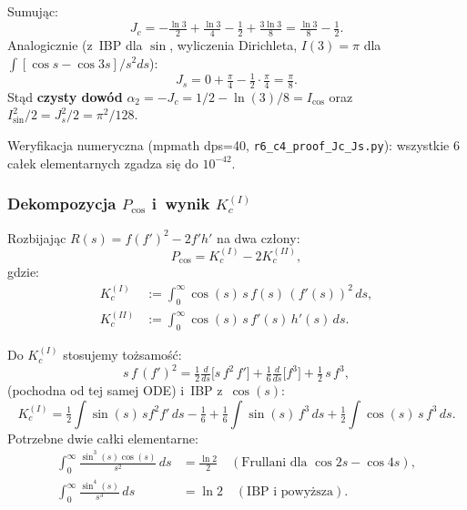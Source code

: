 Sumuj\k{a}c:
\begin{equation}
  \boxed{\;J_c = -\tfrac{\ln 3}{2} + \tfrac{\ln 3}{4} - \tfrac{1}{2} + \tfrac{3\ln 3}{8}
          = \tfrac{\ln 3}{8} - \tfrac{1}{2}.\;}
\end{equation}
Analogicznie (z~IBP dla $\sin$, wyliczenia Dirichleta, $I(3) = \pi$ dla $\int [\cos s - \cos 3s]/s^2 ds$):
\begin{equation}
  \boxed{\;J_s = 0 + \tfrac{\pi}{4} - \tfrac{1}{2}\cdot\tfrac{\pi}{4} = \tfrac{\pi}{8}.\;}
\end{equation}
St\k{a}d \textbf{czysty dow\'od} $\alpha_2 = -J_c = 1/2 - \ln(3)/8 = I_{\cos}$ oraz
$I_{\sin}^2/2 = J_s^2/2 = \pi^2/128$.

Weryfikacja numeryczna (mpmath dps=40, \texttt{r6\_c4\_proof\_Jc\_Js.py}):
wszystkie 6 ca\l{}ek elementarnych zgadza si\k{e} do $10^{-42}$.

\subsubsection*{Dekompozycja $P_{\cos}$ i~wynik $K_c^{(I)}$}

Rozbijaj\k{a}c $R(s) = f(f')^2 - 2 f' h'$ na dwa cz\l{}ony:
\begin{equation}
  P_{\cos} = K_c^{(I)} - 2 K_c^{(II)},
\end{equation}
gdzie:
\begin{align}
  K_c^{(I)} &:= \int_0^\infty \cos(s)\,s\,f(s)\,(f'(s))^2\,ds, \\
  K_c^{(II)} &:= \int_0^\infty \cos(s)\,s\,f'(s)\,h'(s)\,ds.
\end{align}

Do $K_c^{(I)}$ stosujemy to\.zsamo\'s\'c:
\begin{equation}
  s\,f\,(f')^2 = \tfrac{1}{2}\tfrac{d}{ds}\big[s\,f^2\,f'\big] + \tfrac{1}{6}\tfrac{d}{ds}\big[f^3\big] + \tfrac{1}{2}\,s\,f^3,
\end{equation}
(pochodna od tej samej ODE) i~IBP z~$\cos(s)$:
\begin{equation}
  K_c^{(I)} = \tfrac{1}{2}\int \sin(s)\,s f^2 f'\,ds - \tfrac{1}{6}
              + \tfrac{1}{6}\int \sin(s)\,f^3\,ds + \tfrac{1}{2}\int \cos(s)\,s\,f^3\,ds.
\end{equation}
Potrzebne dwie ca\l{}ki elementarne:
\begin{align}
  \int_0^\infty \tfrac{\sin^3(s)\cos(s)}{s^2}\,ds &= \tfrac{\ln 2}{2} \quad (\text{Frullani dla } \cos 2s - \cos 4s), \\
  \int_0^\infty \tfrac{\sin^4(s)}{s^3}\,ds &= \ln 2 \quad (\text{IBP i~powy\.zsza}).
\end{align}

